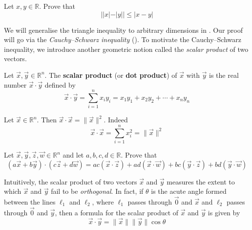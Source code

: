 \begin{exercise}
Let $x,y \in \mathbb{R}$. Prove that
\[ ||x|-|y|| \le |x-y| \]
\end{exercise}

We will generalise the triangle inequality to arbitrary dimensions in . Our proof will go via the \textit{Cauchy--Schwarz inequality} (). To motivate the Cauchy--Schwarz inequality, we introduce another geometric notion called the \textit{scalar product} of two vectors.

\begin{definition}
\label{defScalarProduct}
Let $\vec x,\vec y \in \mathbb{R}^n$. The \textbf{scalar product} (or \textbf{dot product}) of $\vec x$ with $\vec y$ is the real number $\vec x \cdot \vec y$  defined by
\[ \vec x \cdot \vec y = \sum_{i=1}^n x_iy_i = x_1y_1+x_2y_2+\cdots+x_ny_n \]
\end{definition}

\begin{example}
\label{exVectorDotItself}
Let $\vec x \in \mathbb{R}^n$. Then $\vec x \cdot \vec x = \lVert \vec x \rVert^2$. Indeed
\[ \vec x \cdot \vec x = \sum_{i=1}^n x_i^2 = \lVert \vec x \rVert^2 \]
\end{example}

\begin{exercise}
\label{exScalarProductIsBilinear}
Let $\vec x, \vec y, \vec z, \vec w \in \mathbb{R}^n$ and let $a,b,c,d \in \mathbb{R}$. Prove that
\[ (a \vec x + b \vec y) \cdot (c \vec z + d \vec w) = ac (\vec x \cdot \vec z) + ad (\vec x \cdot \vec w) + bc( \vec y \cdot \vec z) + bd (\vec y \cdot \vec w) \]
\end{exercise}

Intuitively, the scalar product of two vectors $\vec x$ and $\vec y$ measures the extent to which $\vec x$ and $\vec y$ fail to be \textit{orthogonal}. In fact, if $\theta$ is the acute angle formed between the lines $\ell_1$ and $\ell_2$, where $\ell_1$ passes through $\vec 0$ and $\vec x$ and $\ell_2$ passes through $\vec 0$ and $\vec y$, then a formula for the scalar product of $\vec x$ and $\vec y$ is given by
\[ \vec x \cdot \vec y = \lVert \vec x \rVert \lVert \vec y \rVert \cos \theta \]

\begin{center}
\end{center}

